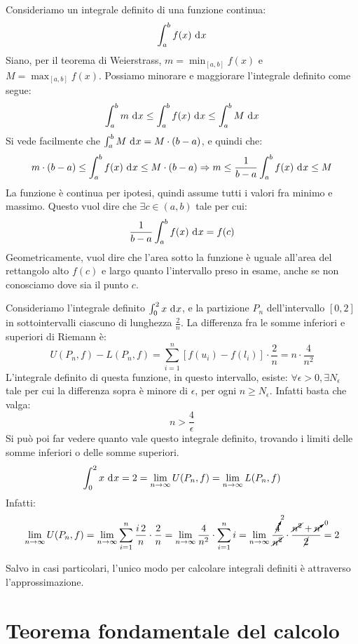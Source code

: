 Consideriamo un integrale definito di una funzione continua:
\[
\int_{a}^{b} f(x) \dx
\]
Siano, per il teorema di Weierstrass, $m = \min_{[a,b]} f(x)$ e $M = \max_{[a,b]} f(x)$. Possiamo minorare e maggiorare l'integrale definito come segue:
\[
\int_{a}^{b} m \dx \le \int_{a}^{b} f(x) \dx \le \int_{a}^{b} M \dx
\]
Si vede facilmente che $\int_{a}^{b} M \dx = M \cdot (b - a)$, e quindi che:
\[
m \cdot (b - a) \le \int_{a}^{b} f(x) \dx \le M \cdot (b - a) \implies
m \le \frac{1}{b - a} \int _{a}^{b} f(x) \dx \le M
\]
La funzione \`e continua per ipotesi, quindi assume tutti i valori fra minimo e massimo. Questo vuol dire che $\exists c \in (a,b)$ tale per cui:
\[
\frac{1}{b - a} \int_{a}^{b} f(x) \dx = f(c)
\]
Geometricamente, vuol dire che l'area sotto la funzione \`e uguale all'area del rettangolo alto $f(c)$ e largo quanto l'intervallo preso in esame, anche se non conosciamo dove sia il punto $c$.

\begin{exmp}
Consideriamo l'integrale definito $\int_{0}^{2} x \dx$, e la partizione $P_n$ dell'intervallo $[0,2]$ in sottointervalli ciascuno di lunghezza $\frac{2}{n}$. La differenza fra le somme inferiori e superiori di Riemann \`e:
\[
U(P_n, f) - L(P_n, f) = \sum_{i = 1}^{n} \left[ f(u_i) - f(l_i) \right] \cdot \frac{2}{n} = n \cdot \frac{4}{n^2}
\]
L'integrale definito di questa funzione, in questo intervallo, esiste: $\forall \epsilon > 0, \exists N_{\epsilon}$ tale per cui la differenza sopra \`e minore di $\epsilon$, per ogni $n \ge N_{\epsilon}$. Infatti basta che valga:
\[
n > \frac{4}{\epsilon}
\]
Si pu\`o poi far vedere quanto vale questo integrale definito, trovando i limiti delle somme inferiori o delle somme superiori.
\[
\int_{0}^{2} x \dx = 2 = \lim_{n \to \infty} U(P_n, f) = \lim_{n \to \infty} L(P_n, f)
\]
Infatti:
\[
\lim_{n \to \infty} U(P_n,f) = 
\lim_{n \to \infty} \sum_{i = 1}^{n} \frac{i \, 2}{n} \cdot \frac{2}{n} = \lim_{n \to \infty} \frac{4}{n^2} \cdot \sum_{i = 1}^{n} i =
\lim_{n \to \infty} \frac{\cancelto{2}{4}}{\cancel{n^2}} \cdot \frac{\cancel{n^2} + \cancelto{0}{n}}{\cancel{2}} = 2
\]
\end{exmp}

Salvo in casi particolari, l'unico modo per calcolare integrali definiti \`e attraverso l'approssimazione.

\section{Teorema fondamentale del calcolo}

